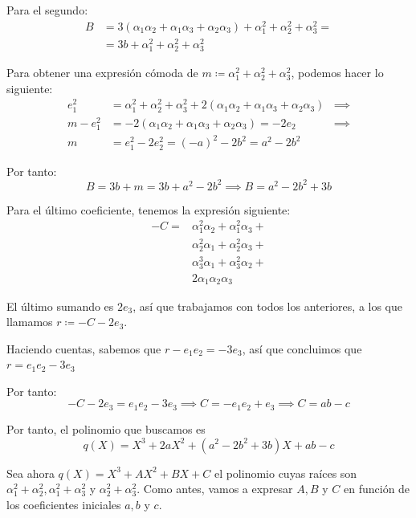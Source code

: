 \documentclass[a4paper, 11pt]{article}
\begin{document}
\begin{solucion}
\begin{apartado}
          Para el segundo:
          \begin{align*}
              B &= 3(\alpha_1\alpha_2 + \alpha_1\alpha_3 + \alpha_2\alpha_3) + \alpha_1^2 + \alpha_2^2 + \alpha_3^2 = \\
                &= 3b + \alpha_1^2 + \alpha_2^2 + \alpha_3^2
          \end{align*}

          Para obtener una expresión cómoda de $m \coloneqq \alpha_1^2 + \alpha_2^2 + \alpha_3^2$, podemos hacer lo siguiente:
          \begin{align*}
          e_1^2 &= \alpha_1^2 + \alpha_2^2 + \alpha_3^2 + 2(\alpha_1\alpha_2+\alpha_1\alpha_3+\alpha_2\alpha_3) &\implies \\
          m - e_1^2 &= -2(\alpha_1\alpha_2+\alpha_1\alpha_3+\alpha_2\alpha_3) = -2e_2 &\implies \\
          m &= e_1^2 - 2e_2^2 = (-a)^2 -2b^2 = a^2 -2b^2
          \end{align*}

          Por tanto:
          \[
              B = 3b + m = 3b +a^2  -2b^2 \implies \boxed{B = a^2 -2b^2 + 3b}
          \]

          Para el último coeficiente, tenemos la expresión siguiente:
          \begin{align*}
              -C =& \alpha_1^2\alpha_2 + \alpha_1^2\alpha_3 + \\
                  & \alpha_2^2\alpha_1 + \alpha_2^2\alpha_3 + \\
                  & \alpha_3^3\alpha_1 + \alpha_3^2\alpha_2 + \\
                  & 2\alpha_1\alpha_2\alpha_3
          \end{align*}

          El último sumando es $2e_3$, así que trabajamos con todos los anteriores, a los que llamamos $r \coloneqq -C - 2e_3$.

          Haciendo cuentas, sabemos que $r-e_1e_2 = -3e_3$, así que concluimos que $r=e_1e_2 - 3e_3$

          Por tanto:
          \[
              -C -2e_3 = e_1e_2 - 3e_3 \implies C = -e_1e_2 + e_3 \implies \boxed{C = ab - c}
          \]

          Por tanto, el polinomio que buscamos es
          \[
          \boxed{q(X) = X^3 + 2aX^2 + (a^2 -2b^2 + 3b)X + ab -c}
          \]
      \end{apartado}

      \begin{apartado}
           Sea ahora $q(X) = X^3 + AX^2 + BX + C$ el polinomio cuyas raíces son $\alpha_1^2+\alpha_2^2, \alpha_1^2+\alpha_3^2$ y $\alpha_2^2+\alpha_3^2$. Como antes, vamos a expresar $A,B$ y $C$ en función de los coeficientes iniciales $a,b$ y $c$.


\end{apartado}
\end{solucion}
\end{document}
